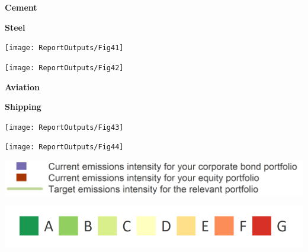 \documentclass[10pt,table,a4]{article}\usepackage[]{graphicx}\usepackage[]{color}
\begin{document}
	\begin{multicols}{2}
		
		\textbf{Cement}
		
		\textbf{Steel}
		
	\end{multicols}
	
	\setlength\multicolsep{0pt}
	\vspace{0cm}
	
	\begin{multicols}{2}
		
		\texttt{[image: ReportOutputs/Fig41]} \vfill\null \columnbreak
		
		\texttt{[image: ReportOutputs/Fig42]}
		
	\end{multicols}
	
	\begin{multicols}{2}
		
		\textbf{Aviation}
		
		\textbf{Shipping}
		
	\end{multicols}
	
	\vspace{0cm}
	
	\begin{multicols}{2}
		
		\texttt{[image: ReportOutputs/Fig43]}  \vfill\null \columnbreak
		
		\texttt{[image: ReportOutputs/Fig44]}
		
	\end{multicols}
	
	\vspace{0pt}
	\setlength\multicolsep{0pt}
	
	\begin{multicols}{2}
		\includegraphics[width=1\linewidth]{ReportGraphics/OtherSectorLegend}
		
		
		\begin{center}
			\includegraphics[width=0.6\linewidth]{ReportGraphics/ShippingLegend}
		\end{center}	
		
	\end{multicols}
	
\end{document}
